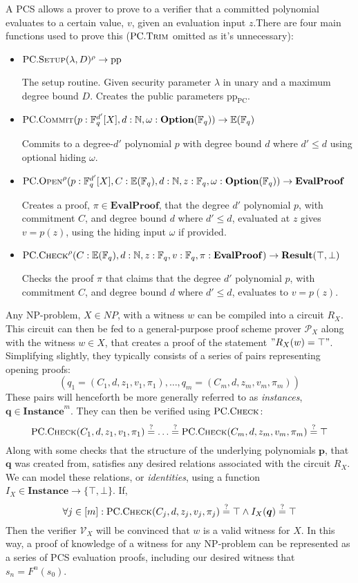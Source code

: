 \documentclass[
]{article}
\newcommand*\Fb{\mathbb{F}}
\newcommand*\Nb{\mathbb{N}}
\newcommand*\Eb{\mathbb{E}}
\newcommand*\Pc{\mathcal{P}}
\newcommand*\Vc{\mathcal{V}}
\renewcommand*\l{\lambda}
\renewcommand*\o{\omega}
\newcommand*\meq{\stackrel{?}{=}}
\renewcommand{\vec}[1]{ \boldsymbol{#1} }
\newcommand*{\pp}{\mathrm{pp}}
\newcommand*{\Setup}{\mathrm{\text{S{\scriptsize ETUP}}}}
\newcommand*{\Trim}{\mathrm{\text{T{\scriptsize RIM}}}}
\newcommand*{\Commit}{\mathrm{\text{C{\scriptsize OMMIT}}}}
\newcommand*{\PC}{\text{PC}}
\newcommand*{\PCSetup}{\PC.\Setup}
\newcommand*{\PCTrim}{\PC.\Trim}
\newcommand*{\PCCommit}{\PC.\Commit}
\newcommand*{\PCOpen}{\PC.\mathrm{\text{O\scriptsize PEN}}}
\newcommand*{\PCCheck}{\PC.\mathrm{\text{C\scriptsize HECK}}}
\newcommand*\Result{\mathbf{Result}}
\newcommand*\Option{\mathbf{Option}}
\newcommand*\Instance{\mathbf{Instance}}
\newcommand*\EvalProof{\mathbf{EvalProof}}
\begin{document}
A PCS allows a prover to prove to a verifier that a committed polynomial
evaluates to a certain value, \(v\), given an evaluation input
\(z\).There are four main functions used to prove this (\(\PCTrim\)
omitted as it's unnecessary):

\begin{itemize}
\item
  \(\PCSetup(\l, D)^\rho \to \pp\)

  The setup routine. Given security parameter \(\l\) in unary and a
  maximum degree bound \(D\). Creates the public parameters \(\pp_\PC\).
\item
  \(\PCCommit(p: \Fb^{d'}_q[X], d: \Nb, \o: \Option(\Fb_q)) \to \Eb(\Fb_q)\)

  Commits to a degree-\(d'\) polynomial \(p\) with degree bound \(d\)
  where \(d'
  \leq d\) using optional hiding \(\o\).
\item
  \(\PCOpen^\rho(p: \Fb^{d'}_q[X], C: \Eb(\Fb_q), d: \Nb, z: \Fb_q, \o: \Option(\Fb_q)) \to \EvalProof\)

  Creates a proof, \(\pi \in \EvalProof\), that the degree \(d'\)
  polynomial \(p\), with commitment \(C\), and degree bound \(d\) where
  \(d' \leq d\), evaluated at \(z\) gives \(v = p(z)\), using the hiding
  input \(\o\) if provided.
\item
  \(\PCCheck^\rho(C: \Eb(\Fb_q), d: \Nb, z: \Fb_q, v: \Fb_q, \pi: \EvalProof) \to \Result(\top, \bot)\)

  Checks the proof \(\pi\) that claims that the degree \(d'\) polynomial
  \(p\), with commitment \(C\), and degree bound \(d\) where
  \(d' \leq d\), evaluates to \(v = p(z)\).
\end{itemize}

Any NP-problem, \(X \in NP\), with a witness \(w\) can be compiled into
a circuit \(R_X\). This circuit can then be fed to a general-purpose
proof scheme prover \(\Pc_X\) along with the witness \(w \in X\), that
creates a proof of the statement \("R_X(w) = \top"\). Simplifying
slightly, they typically consists of a series of pairs representing
opening proofs:
\[(q_1 = (C_1, d, z_1, v_1, \pi_1), \dots, q_m = (C_m, d, z_m, v_m, \pi_m))\]
These pairs will henceforth be more generally referred to as
\emph{instances}, \(\vec{q} \in \Instance^m\). They can then be verified
using \(\PCCheck\):
\[\PCCheck(C_1, d, z_1, v_1, \pi_1) \meq \dots \meq \PCCheck(C_m, d, z_m, v_m, \pi_m) \meq \top\]
Along with some checks that the structure of the underlying polynomials
\(\vec{p}\), that \(\vec{q}\) was created from, satisfies any desired
relations associated with the circuit \(R_X\). We can model these
relations, or \emph{identities}, using a function
\(I_X \in \Instance \to \{ \top, \bot \}\). If,
\[\forall j \in [m] : \PCCheck(C_j, d, z_j, v_j, \pi_j) \meq \top \land I_X(\vec{q}) \meq \top\]
Then the verifier \(\Vc_X\) will be convinced that \(w\) is a valid
witness for \(X\). In this way, a proof of knowledge of a witness for
any NP-problem can be represented as a series of PCS evaluation proofs,
including our desired witness that \(s_n = F^n(s_0)\).
\end{document}
